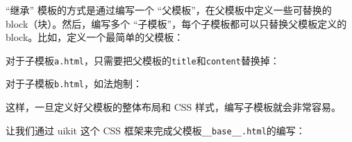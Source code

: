 ``继承'' 模板的方式是通过编写一个 ``父模板''，在父模板中定义一些可替换的
block（块）。然后，编写多个
``子模板''，每个子模板都可以只替换父模板定义的
block。比如，定义一个最简单的父模板：


对于子模板\texttt{a.html}，只需要把父模板的\texttt{title}和\texttt{content}替换掉：


对于子模板\texttt{b.html}，如法炮制：


这样，一旦定义好父模板的整体布局和 CSS 样式，编写子模板就会非常容易。

让我们通过 uikit 这个 CSS
框架来完成父模板\texttt{\_\_base\_\_.html}的编写：

